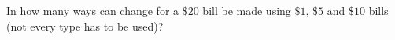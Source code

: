 In how many ways can change for a $\$20$ bill be made using $\$1$, $\$5$ and $\$10$ bills (not every type has to be used)?

